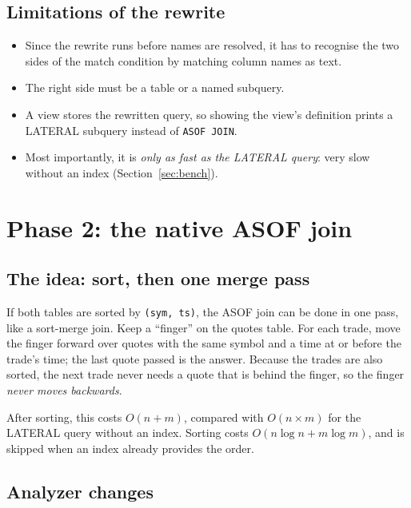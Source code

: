 \documentclass[11pt,a4paper]{article}
\newcommand{\code}[1]{\texttt{#1}}
\begin{document}
\subsection{Limitations of the rewrite}

\begin{itemize}
  \item Since the rewrite runs before names are resolved, it has to recognise the two
        sides of the match condition by matching column names as text.
  \item The right side must be a table or a named subquery.
  \item A view stores the rewritten query, so showing the view's definition prints a
        LATERAL subquery instead of \code{ASOF JOIN}.
  \item Most importantly, it is \emph{only as fast as the LATERAL query}: very slow
        without an index (Section~\ref{sec:bench}).
\end{itemize}

\section{Phase 2: the native ASOF join}

\subsection{The idea: sort, then one merge pass}

If both tables are sorted by \code{(sym, ts)}, the ASOF join can be done in one pass, like
a sort-merge join. Keep a ``finger'' on the quotes table. For each trade, move the finger
forward over quotes with the same symbol and a time at or before the trade's time; the
last quote passed is the answer. Because the trades are also sorted, the next trade never
needs a quote that is behind the finger, so the finger \emph{never moves backwards}.

After sorting, this costs $O(n + m)$, compared with $O(n \times m)$ for the LATERAL query
without an index. Sorting costs $O(n \log n + m \log m)$, and is skipped when an index
already provides the order.

\subsection{Analyzer changes}
\end{document}
